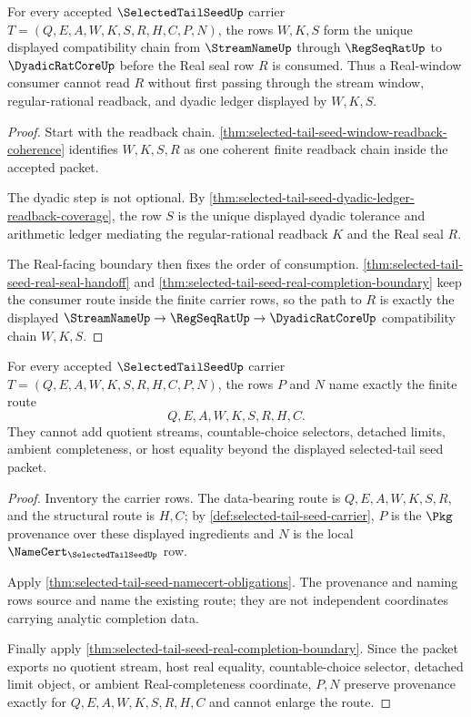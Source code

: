 \begin{theorem}
\label{thm:selected-tail-seed-stream-regseq-dyadic-compatibility}
For every accepted $\SelectedTailSeedUp$ carrier $T=(Q,E,A,W,K,S,R,H,C,P,N)$, the rows $W,K,S$ form the unique displayed compatibility chain from $\StreamNameUp$ through $\RegSeqRatUp$ to $\DyadicRatCoreUp$ before the Real seal row $R$ is consumed. Thus a Real-window consumer cannot read $R$ without first passing through the stream window, regular-rational readback, and dyadic ledger displayed by $W,K,S$.
\end{theorem}
\begin{proof}
Start with the readback chain. \autoref{thm:selected-tail-seed-window-readback-coherence} identifies $W,K,S,R$ as one coherent finite readback chain inside the accepted packet.

The dyadic step is not optional. By \autoref{thm:selected-tail-seed-dyadic-ledger-readback-coverage}, the row $S$ is the unique displayed dyadic tolerance and arithmetic ledger mediating the regular-rational readback $K$ and the Real seal $R$.

The Real-facing boundary then fixes the order of consumption. \autoref{thm:selected-tail-seed-real-seal-handoff} and \autoref{thm:selected-tail-seed-real-completion-boundary} keep the consumer route inside the finite carrier rows, so the path to $R$ is exactly the displayed $\StreamNameUp \to \RegSeqRatUp \to \DyadicRatCoreUp$ compatibility chain $W,K,S$.
\end{proof}

\begin{theorem}
\label{thm:selected-tail-seed-pkg-provenance-exactness}
For every accepted $\SelectedTailSeedUp$ carrier $T=(Q,E,A,W,K,S,R,H,C,P,N)$, the rows $P$ and $N$ name exactly the finite route
$$
Q,E,A,W,K,S,R,H,C.
$$
They cannot add quotient streams, countable-choice selectors, detached limits, ambient completeness, or host equality beyond the displayed selected-tail seed packet.
\end{theorem}
\begin{proof}
Inventory the carrier rows. The data-bearing route is $Q,E,A,W,K,S,R$, and the structural route is $H,C$; by \autoref{def:selected-tail-seed-carrier}, $P$ is the $\Pkg$ provenance over these displayed ingredients and $N$ is the local $\NameCert_{\SelectedTailSeedUp}$ row.

Apply \autoref{thm:selected-tail-seed-namecert-obligations}. The provenance and naming rows source and name the existing route; they are not independent coordinates carrying analytic completion data.

Finally apply \autoref{thm:selected-tail-seed-real-completion-boundary}. Since the packet exports no quotient stream, host real equality, countable-choice selector, detached limit object, or ambient Real-completeness coordinate, $P,N$ preserve provenance exactly for $Q,E,A,W,K,S,R,H,C$ and cannot enlarge the route.
\end{proof}

